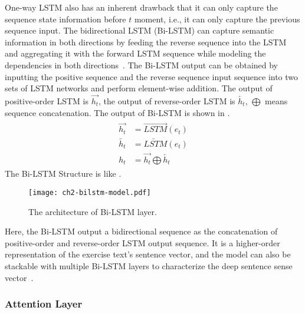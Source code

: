 One-way LSTM also has an inherent drawback that it can only capture the sequence state information before \(t\) moment, i.e., it can only capture the previous sequence input. The bidirectional LSTM (Bi-LSTM) can capture semantic information in both directions by feeding the reverse sequence into the LSTM and aggregating it with the forward LSTM sequence while modeling the dependencies in both directions~\cite{liu2019bidirectional}. The Bi-LSTM output can be obtained by inputting the positive sequence and the reverse sequence input sequence into two sets of LSTM networks and perform element-wise addition. The output of positive-order LSTM is \(\overrightarrow{h_t}\), the output of reverse-order LSTM is \(\overleftarrow{h_t}\), \(\bigoplus \) means sequence concatenation. The output of Bi-LSTM is shown in \figname{\ref{fml:ch2-bilstm-output}}.
\begin{align}\label{fml:ch2-bilstm-output}
    \begin{split}
        \overrightarrow{h_t} & = \overrightarrow{LSTM}(e_t)                       \\
        \overleftarrow{h_t}  & = \overleftarrow{LSTM}(e_t)                        \\
        h_t                  & =\overrightarrow{h_t}\bigoplus \overleftarrow{h_t}
    \end{split}
\end{align}
The Bi-LSTM Structure is like \figname{\ref{fig:ch2-model-bilstm}}.

\begin{figure}[htb]
    \centering
    \texttt{[image: ch2-bilstm-model.pdf]}
    \caption{The architecture of Bi-LSTM layer.}\label{fig:ch2-model-bilstm}
\end{figure}

Here, the Bi-LSTM output a bidirectional sequence as the concatenation of positive-order and reverse-order LSTM output sequence. It is a higher-order representation of the exercise text's sentence vector, and the model can also be stackable with multiple Bi-LSTM layers to characterize the deep sentence sense vector~\cite{jang2020bi}.



\subsubsection{Attention Layer}

